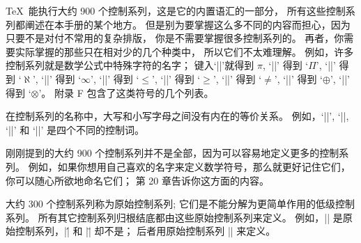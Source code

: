 \TeX\ 能执行大约 900 个控制系列，这是它的内置语汇的一部分，
所有这些控制系列都阐述在本手册的某个地方。%
但是别为要掌握这么多不同的内容而担心，因为只要不是对付不常用的复杂排版，
你是不需要掌握很多控制系列的。%
再者，你需要实际掌握的那些只在相对少的几个种类\hbox{中，} 所以它们不太难理解。%
例如，许多控制系列就是数学公式中特殊字符的名字；
键入`|\pi|'就得到 $\pi$,
`|\Pi|' 得到 `$\Pi$',
`|\aleph|' 得到 `$\aleph$',
`|\infty|' 得到 `$\infty$',
`|\le|' 得到 `$\le$',
`|\ge|' 得到 `$\ge$',
`|\ne|' 得到 `$\ne$',
`|\oplus|' 得到 `$\oplus$',
`|\otimes|' 得到 `$\otimes$'。%
附录 F 包含了这类符号的几个列表。

\danger 在控制系列的名称中，大写和小写字母之间没有内在的等价关系。%
例如，`|\pi|', `|\Pi|, `|\PI|' 和 `|\pI|' 是四个不同的控制词。

刚刚提到的大约 900 个控制系列并不是全部，因为可以容易地定义更多的控制系列。%
例如，如果你想用自己喜欢的名字来定义数学符号，那么就更好记住它们，
你可以随心所欲地命名它们；
第 20 章告诉你这方面的内容。

大约 300 个控制系列称为{原始控制系列};
它们是不能分解为更简单作用的低级控制系列。%
所有其它控制系列归根结底都由这些原始控制系列来定义。%
例如，|| 是原始控制系列，|\'| 和 |\"| 却不是；
后者用原始控制系列 |\accent| 来定义。

